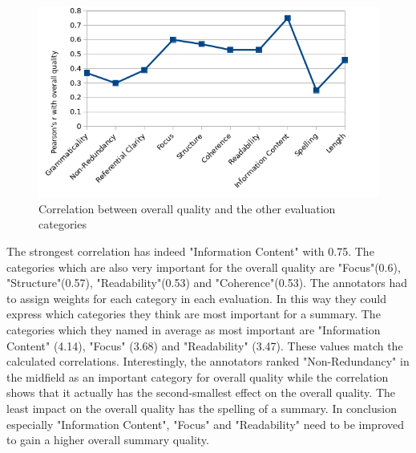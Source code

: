 \begin{figure}
	\centering
	\label{fig:corr_overall_quality}
	\caption{Correlation between overall quality and the other evaluation categories}
	\includegraphics[width=0.8\linewidth]{figures/correlation_overall_quality.png}
\end{figure}

The strongest correlation has indeed "Information Content" with 0.75. The categories which are also very important for the overall quality are "Focus"(0.6), "Structure"(0.57), "Readability"(0.53) and "Coherence"(0.53). The annotators had to assign weights for each category in each evaluation. In this way they could express which categories they think are most important for a summary. The categories which they named in average as most important are "Information Content" (4.14), "Focus" (3.68) and "Readability" (3.47). These values match the calculated correlations. Interestingly, the annotators ranked "Non-Redundancy" in the midfield as an important category for overall quality while the correlation shows that it actually has the second-smallest effect on the overall quality. The least impact on the overall quality has the spelling of a summary. In conclusion especially "Information Content", "Focus" and "Readability" need to be improved to gain a higher overall summary quality.